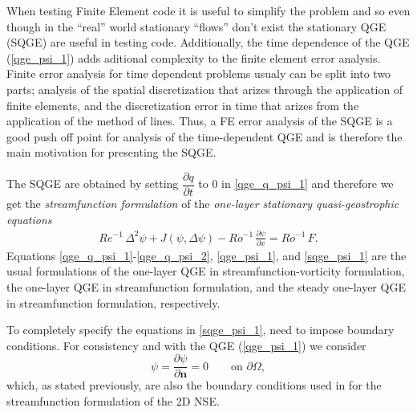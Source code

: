 When testing Finite Element code it is useful to simplify the problem and so even though in the
``real'' world stationary ``flows'' don't exist the stationary QGE (SQGE) are useful in testing code.  Additionally,
the time dependence of the QGE (\eqref{qge_psi_1}) adds aditional complexity to the finite element
error analysis. Finite error analysis for time dependent problems usualy can be split into two
parts; analysis of the spatial discretization that arizes through the application of finite
elements, and the discretization error in time that arizes from the application of the method of
lines. Thus, a FE error analysis of the SQGE is a good push off point for analysis of the
time-dependent QGE and is therefore the main motivation for presenting the SQGE.

The SQGE are obtained by setting $\dfrac{\partial q}{\partial t}$ to $0$ in \eqref{qge_q_psi_1} and
therefore we get the \emph{streamfunction formulation} of the \emph{one-layer stationary
quasi-geostrophic equations}
\begin{eqnarray}
  Re^{-1} \, \Delta^2 \psi + J(\psi , \Delta \psi) - Ro^{-1} \, \frac{\partial \psi}{\partial x} =
    Ro^{-1} \, F .
  \label{sqge_psi_1}
\end{eqnarray}
Equations \eqref{qge_q_psi_1}-\eqref{qge_q_psi_2}, \eqref{qge_psi_1}, and \eqref{sqge_psi_1} are the
usual formulations of the one-layer QGE in streamfunction-vorticity formulation, the one-layer QGE
in streamfunction formulation, and the steady one-layer QGE in streamfunction formulation,
respectively. 

To completely specify the equations in \eqref{sqge_psi_1}, need to impose boundary conditions. For
consistency and with the QGE (\eqref{qge_psi_1})  we consider 
\begin{equation*}
  \psi = \frac{\partial \psi}{\partial \mathbf{n}} = 0 \qquad \text{on } \partial \Omega,
\end{equation*}
which, as stated previously, are also the boundary conditions used in \cite{Gunzburger89} for the
streamfunction formulation of the 2D NSE.

